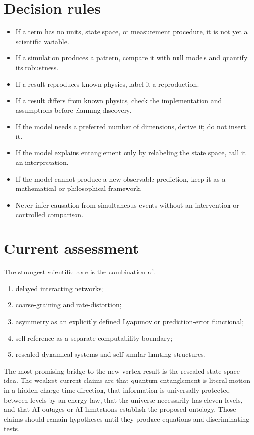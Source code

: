 \documentclass[11pt]{article}
\theoremstyle{definition}
\theoremstyle{plain}
\theoremstyle{remark}
\begin{document}
\section{Decision rules}

\begin{itemize}
  \item If a term has no units, state space, or measurement procedure, it is not yet a scientific variable.
  \item If a simulation produces a pattern, compare it with null models and quantify its robustness.
  \item If a result reproduces known physics, label it a reproduction.
  \item If a result differs from known physics, check the implementation and assumptions before claiming discovery.
  \item If the model needs a preferred number of dimensions, derive it; do not insert it.
  \item If the model explains entanglement only by relabeling the state space, call it an interpretation.
  \item If the model cannot produce a new observable prediction, keep it as a mathematical or philosophical framework.
  \item Never infer causation from simultaneous events without an intervention or controlled comparison.
\end{itemize}

\section{Current assessment}

The strongest scientific core is the combination of:
\begin{enumerate}
  \item delayed interacting networks;
  \item coarse-graining and rate-distortion;
  \item asymmetry as an explicitly defined Lyapunov or prediction-error functional;
  \item self-reference as a separate computability boundary;
  \item rescaled dynamical systems and self-similar limiting structures.
\end{enumerate}

The most promising bridge to the new vortex result is the rescaled-state-space idea. The weakest current claims are that quantum entanglement is literal motion in a hidden charge-time direction, that information is universally protected between levels by an energy law, that the universe necessarily has eleven levels, and that AI outages or AI limitations establish the proposed ontology. Those claims should remain hypotheses until they produce equations and discriminating tests.
\end{document}
